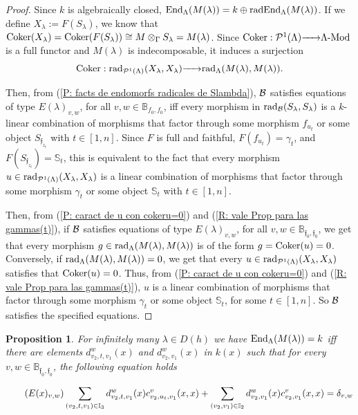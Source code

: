 \documentclass{article}
\newtheorem{proposition}[theorem]{Proposition}
\theoremstyle{definition}
\newcommand{\End}{{ \rm End }}
\newcommand{\Coker}{{ \rm Coker }}
\newcommand{\Mod}{{ \rm Mod }}
\newcommand{\rad}{{ \rm rad }}
\renewcommand{\frak}{\mathfrak}
\newcommand{\g}{\hbox{-}}
\newcommand{\hueca}[1]{\mathbb{#1}}
\newcommand{\rightmap}[1]{\smash{\mathop{\hbox to 
20pt{\rightarrowfill}}\limits^{#1}}}
\begin{document}
\begin{proof} Since $k$ is algebraically closed, $\End_\Lambda(M(\lambda))=k\oplus \rad\End_\Lambda(M(\lambda))$. If we define  $X_\lambda:=F(S_\lambda)$, we know that $\Coker(X_\lambda)=\Coker (F(S_\lambda))\cong M\otimes_\Gamma S_\lambda=M(\lambda)$. Since $\Coker:{\cal P}^1(\Lambda)\rightmap{}\Lambda\g\Mod$ is a full functor and $M(\lambda)$ is indecomposable, it induces a surjection 
$$\Coker: \rad_{{\cal P}^1(\Lambda)}(X_\lambda,X_\lambda)\rightmap{}\rad_\Lambda(M(\lambda),M(\lambda)).$$ 


Then, from (\ref{P: facts de endomorfs radicales de Slambda}), ${\cal B}$ satisfies equations of type  $E(\lambda)_{v,w}$, for all $v,w\in \hueca{B}_{f_0,f_0}$, iff every morphism in $\rad_{\cal B}(S_\lambda,S_\lambda)$ is a $k$-linear combination of 
morphisms that factor through some morphism $f_{u_t}$ or some object $S_{\frak{f}_{z_t}}$  with $t\in [1,n]$. Since $F$ is full and faithful, $F(f_{u_t})=\gamma_t$, and $F(S_{\frak{f}_{z_t}})=\hueca{S}_t$, this is equivalent to the fact that every morphism 
$u\in \rad_{{\cal P}^1(\Lambda)}(X_\lambda,X_\lambda)$ is a linear combination of 
morphisms that  factor through some morphism $\gamma_t$ or some object $\hueca{S}_t$  with  $t\in [1,n]$.
 


Then, from (\ref{P: caract de u con cokeru=0}) and (\ref{R: vale Prop para las gammas(t)}), if ${\cal B}$ satisfies equations of type  $E(\lambda)_{v,w}$, for all $v,w\in \hueca{B}_{\frak{f}_0,\frak{f}_0}$, we get that every morphism  $g\in\rad_\Lambda(M(\lambda),M(\lambda))$ is of the form $g=\Coker(u)=0$. Conversely, if 
$\rad_\Lambda(M(\lambda),M(\lambda))=0$, we get that every $u\in \rad_{{\cal P}^1(\Lambda)}(X_\lambda,X_\lambda)$ satisfies that $\Coker(u)=0$. Thus, from (\ref{P: caract de u con cokeru=0}) and (\ref{R: vale Prop para las gammas(t)}), $u$ is a linear combination of morphisms  that factor through some morphism $\gamma_t$  or some object $\hueca{S}_t$, for some $t\in [1,n]$. So ${\cal B}$ satisfies the specified equations. 
\end{proof}

\begin{proposition}\label{P: la eq E(x)}
For infinitely many $\lambda\in D(h)$ we have 
$\End_\Lambda(M(\lambda))=k$ iff there are elements  $d^w_{v_2,t,v_1}(x)$ and $d^w_{v_2,v_1}(x)$ in $k(x)$ such that for every $v,w\in \hueca{B}_{\frak{f}_0,\frak{f}_0}$, the following equation holds
 
\begin{equation}\tag{$E(x)_{v,w}$}
\sum_{(v_2,t,v_1)\in \hueca{I}_3}
d^w_{v_2,t,v_1}(x)c^v_{v_2,u_t,v_1}(x,x)
+
\sum_{(v_2,v_1)\in \hueca{I}_2}
d^w_{v_2,v_1}(x)c^v_{v_2,v_1}(x,x)=\delta_{v,w}
\end{equation}
\end{proposition}
\end{document}
